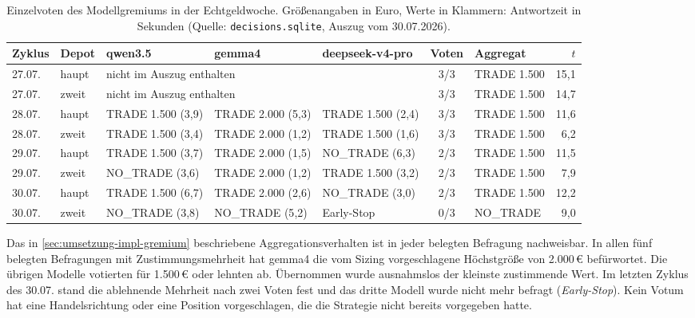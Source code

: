 \begin{table}[htbp]
  \centering
  \footnotesize
  \caption[Einzelvoten des Modellgremiums in der Echtgeldwoche]{%
    Einzelvoten des Modellgremiums in der Echtgeldwoche. Größenangaben in Euro,
    Werte in Klammern: Antwortzeit in Sekunden (Quelle:
    \texttt{decisions.sqlite}, Auszug vom 30.07.2026).\quelleeigen}
  \label{tab:anhang-echtgeldwoche-voten}
  \setlength{\tabcolsep}{4pt}
  \begin{tabular}{l l l l l c l r}
    \toprule
    Zyklus & Depot & qwen3.5 & gemma4 & deepseek-v4-pro & Voten & Aggregat & $t$ \\
    \midrule
    27.07. & haupt & \multicolumn{3}{l}{nicht im Auszug enthalten} & 3/3 & TRADE 1.500 & 15{,}1 \\
    27.07. & zweit & \multicolumn{3}{l}{nicht im Auszug enthalten} & 3/3 & TRADE 1.500 & 14{,}7 \\
    \midrule
    28.07. & haupt & TRADE 1.500 (3{,}9) & TRADE 2.000 (5{,}3) & TRADE 1.500 (2{,}4) & 3/3 & TRADE 1.500 & 11{,}6 \\
    28.07. & zweit & TRADE 1.500 (3{,}4) & TRADE 2.000 (1{,}2) & TRADE 1.500 (1{,}6) & 3/3 & TRADE 1.500 &  6{,}2 \\
    \midrule
    29.07. & haupt & TRADE 1.500 (3{,}7) & TRADE 2.000 (1{,}5) & NO\_TRADE (6{,}3)   & 2/3 & TRADE 1.500 & 11{,}5 \\
    29.07. & zweit & NO\_TRADE (3{,}6)   & TRADE 2.000 (1{,}2) & TRADE 1.500 (3{,}2) & 2/3 & TRADE 1.500 &  7{,}9 \\
    \midrule
    30.07. & haupt & TRADE 1.500 (6{,}7) & TRADE 2.000 (2{,}6) & NO\_TRADE (3{,}0)   & 2/3 & TRADE 1.500 & 12{,}2 \\
    30.07. & zweit & NO\_TRADE (3{,}8)   & NO\_TRADE (5{,}2)   & Early-Stop          & 0/3 & NO\_TRADE   &  9{,}0 \\
    \bottomrule
  \end{tabular}
\end{table}

Das in \cref{sec:umsetzung-impl-gremium} beschriebene Aggregationsverhalten ist in
jeder belegten Befragung nachweisbar. In allen fünf belegten Befragungen mit
Zustimmungsmehrheit hat gemma4 die vom Sizing vorgeschlagene
Höchstgröße von 2.000\,€ befürwortet. Die übrigen Modelle votierten für 1.500\,€
oder lehnten ab. Übernommen wurde ausnahmslos der kleinste zustimmende Wert.
Im letzten Zyklus des 30.07. stand die ablehnende Mehrheit nach zwei Voten fest
und das dritte Modell wurde nicht mehr befragt (\emph{Early-Stop}). Kein Votum hat
eine Handelsrichtung oder eine Position vorgeschlagen, die die Strategie nicht
bereits vorgegeben hatte.


